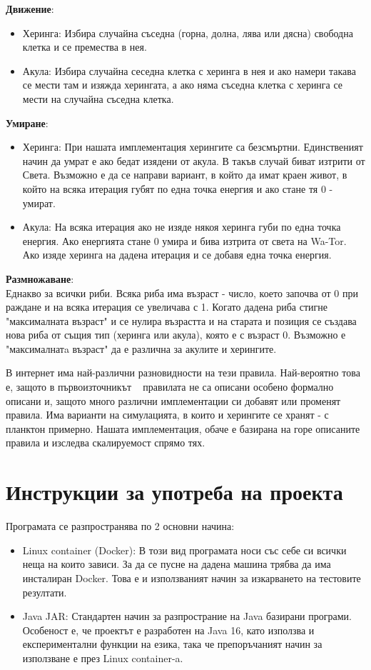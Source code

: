 \documentclass[12pt]{article}
\begin{document}
\bigbreak
\textbf{Движение}:
\begin{itemize}
	\item Херинга: Избира случайна съседна (горна, долна, лява или дясна) свободна клетка и се премества в нея.
	\item Акула: Избира случайна сеседна клетка с херинга в нея и ако намери такава се мести там и изяжда херингата,
		а ако няма съседна клетка с херинга се мести на случайна съседна клетка. 
\end{itemize}

\textbf{Умиране}:
\begin{itemize}
	\item Херинга: При нашата имплементация херингите са безсмъртни. Единственият начин да умрат е ако бедат изядени
		от акула. В такъв случай биват изтрити от Света. Възможно е да се направи вариант, в който да имат краен живот,
		в който на всяка итерация губят по една точка енергия и ако стане тя 0 - умират.
	\item Акула: На всяка итерация ако не изяде някоя херинга губи по една точка енергия. Ако енергията стане 0
		умира и бива изтрита от света на Wa-Tor. Ако изяде херинга на дадена итерация и се добавя една точка енергия.
\end{itemize}

\textbf{Размножаване}:
\\
Еднакво за всички риби. Всяка риба има възраст - число, което започва от 0 при раждане и на всяка итерация
се увеличава с 1. Когато дадена риба стигне "максималната възраст" и се нулира възрастта и на старата и позиция се създава нова
риба от същия тип (херинга или акула), която е с възраст 0. Възможно е "максималнатa възраст" да е различна за акулите и херингите.

\bigbreak
В интернет има най-различни разновидности на тези правила. Най-вероятно това е, защото в първоизточникът ~\cite{wator}
правилата не са описани особено формално описани и, защото много различни имплементации си добавят или променят правила.
Има варианти на симулацията, в които и херингите се хранят - с планктон примерно. Нашата имплементация, обаче
е базирана на горе описаните правила и изследва скалируемост спрямо тях.

\section{Инструкции за употреба на проекта}
Програмата се разпространява по 2 основни начина:

\begin{itemize}
	\item Linux container (Docker): В този вид програмата носи със себе си всички неща на които зависи.
		За да се пусне на дадена машина трябва да има инсталиран Docker. Това е и използваният начин
		за изкарването на тестовите резултати.
	\item Java JAR: Стандартен начин за разпространие на Java базирани програми. Особеност е, че проектът
		е разработен на Java 16, като използва и експериментални функции на езика, така че
		препоръчаният начин за използване е през Linux container-a.
\end{itemize}
\end{document}
